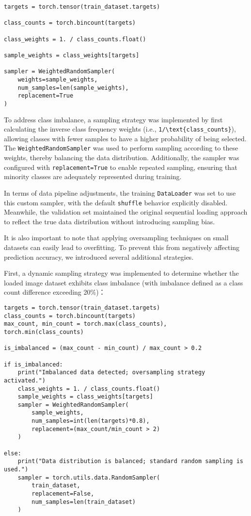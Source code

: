 \begin{verbatim}
targets = torch.tensor(train_dataset.targets)

class_counts = torch.bincount(targets)

class_weights = 1. / class_counts.float()  

sample_weights = class_weights[targets]

sampler = WeightedRandomSampler(
    weights=sample_weights,
    num_samples=len(sample_weights),  
    replacement=True  
)
\end{verbatim}

To address class imbalance, a sampling strategy was implemented by first
calculating the inverse class frequency weights (i.e.,
\texttt{1/\textbackslash{}text\{class\_counts\}}), allowing classes with
fewer samples to have a higher probability of being selected. The
\texttt{WeightedRandomSampler} was used to perform sampling according to
these weights, thereby balancing the data distribution. Additionally,
the sampler was configured with \texttt{replacement=True} to enable
repeated sampling, ensuring that minority classes are adequately
represented during training.

In terms of data pipeline adjustments, the training \texttt{DataLoader}
was set to use this custom sampler, with the default \texttt{shuffle}
behavior explicitly disabled. Meanwhile, the validation set maintained
the original sequential loading approach to reflect the true data
distribution without introducing sampling bias.

It is also important to note that applying oversampling techniques on
small datasets can easily lead to overfitting. To prevent this from
negatively affecting prediction accuracy, we introduced several
additional strategies.

First, a dynamic sampling strategy was implemented to determine whether
the loaded image dataset exhibits class imbalance (with imbalance
defined as a class count difference exceeding 20\%)：

\begin{verbatim}
targets = torch.tensor(train_dataset.targets)
class_counts = torch.bincount(targets)
max_count, min_count = torch.max(class_counts), torch.min(class_counts)

is_imbalanced = (max_count - min_count) / max_count > 0.2

if is_imbalanced:
    print("Imbalanced data detected; oversampling strategy activated.")
    class_weights = 1. / class_counts.float()
    sample_weights = class_weights[targets]
    sampler = WeightedRandomSampler(
        sample_weights,
        num_samples=int(len(targets)*0.8),  
        replacement=(max_count/min_count > 2)  
    )

else:
    print("Data distribution is balanced; standard random sampling is used.")
    sampler = torch.utils.data.RandomSampler(
        train_dataset,
        replacement=False,
        num_samples=len(train_dataset)
    )
\end{verbatim}

